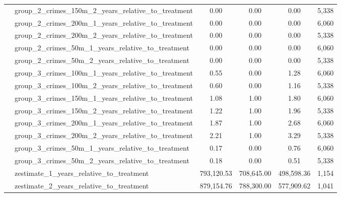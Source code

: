 \begin{tabular}{llcccc}
 & group_2_crimes_150m_2_years_relative_to_treatment & 0.00 & 0.00 & 0.00 & 5,338 \\
 & group_2_crimes_200m_1_years_relative_to_treatment & 0.00 & 0.00 & 0.00 & 6,060 \\
 & group_2_crimes_200m_2_years_relative_to_treatment & 0.00 & 0.00 & 0.00 & 5,338 \\
 & group_2_crimes_50m_1_years_relative_to_treatment & 0.00 & 0.00 & 0.00 & 6,060 \\
 & group_2_crimes_50m_2_years_relative_to_treatment & 0.00 & 0.00 & 0.00 & 5,338 \\
 & group_3_crimes_100m_1_years_relative_to_treatment & 0.55 & 0.00 & 1.28 & 6,060 \\
 & group_3_crimes_100m_2_years_relative_to_treatment & 0.60 & 0.00 & 1.16 & 5,338 \\
 & group_3_crimes_150m_1_years_relative_to_treatment & 1.08 & 1.00 & 1.80 & 6,060 \\
 & group_3_crimes_150m_2_years_relative_to_treatment & 1.22 & 1.00 & 1.96 & 5,338 \\
 & group_3_crimes_200m_1_years_relative_to_treatment & 1.87 & 1.00 & 2.68 & 6,060 \\
 & group_3_crimes_200m_2_years_relative_to_treatment & 2.21 & 1.00 & 3.29 & 5,338 \\
 & group_3_crimes_50m_1_years_relative_to_treatment & 0.17 & 0.00 & 0.76 & 6,060 \\
 & group_3_crimes_50m_2_years_relative_to_treatment & 0.18 & 0.00 & 0.51 & 5,338 \\
 & zestimate_1_years_relative_to_treatment & 793,120.53 & 708,645.00 & 498,598.36 & 1,154 \\
 & zestimate_2_years_relative_to_treatment & 879,154.76 & 788,300.00 & 577,909.62 & 1,041 \\
\cline{1-6}
\bottomrule
\end{tabular}
